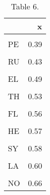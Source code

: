 \begin{table}[H]

\caption{Table 6.}
\centering
\fontsize{8}{10}\selectfont
\begin{tabular}[t]{lr}
\toprule
  & x\\
\midrule
\cellcolor{gray!6}{DO} & \cellcolor{gray!6}{0.28}\\
PE & 0.39\\
\cellcolor{gray!6}{VE} & \cellcolor{gray!6}{0.42}\\
RU & 0.43\\
\cellcolor{gray!6}{MY} & \cellcolor{gray!6}{0.49}\\
\addlinespace
EL & 0.49\\
\cellcolor{gray!6}{FR} & \cellcolor{gray!6}{0.53}\\
TH & 0.53\\
\cellcolor{gray!6}{OL} & \cellcolor{gray!6}{0.56}\\
FL & 0.56\\
\addlinespace
\cellcolor{gray!6}{BR} & \cellcolor{gray!6}{0.56}\\
HE & 0.57\\
\cellcolor{gray!6}{CH} & \cellcolor{gray!6}{0.57}\\
SY & 0.58\\
\cellcolor{gray!6}{EV} & \cellcolor{gray!6}{0.58}\\
\addlinespace
LA & 0.60\\
\cellcolor{gray!6}{KA} & \cellcolor{gray!6}{0.60}\\
NO & 0.66\\
\bottomrule
\end{tabular}
\end{table}
